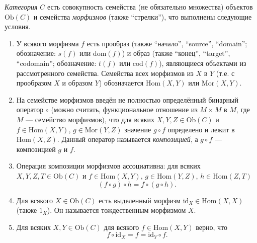 \documentclass[12pt,a4paper]{article}
\newcommand{\Hom}{\mathrm{Hom}}
\newcommand{\Mor}{\mathrm{Mor}}
\newcommand{\dom}{\mathrm{dom}}
\newcommand{\cod}{\mathrm{cod}}
\newcommand{\Ob}{\mathrm{Ob}}
\newcommand{\id}{\mathrm{id}}
\begin{document}
    \begin{definition}
        \emph{Категория} $C$ есть совокупность семейства (не обязательно множества) объектов $\Ob(C)$ и семейства \emph{морфизмов} (также ``стрелки''), что выполнены следующие условия.
        \begin{enumerate}
            \item У всякого морфизма $f$ есть прообраз (также ``начало'', ``source'', ``domain''; обозначение: $s(f)$ или $\dom(f)$) и образ (также ``конец'', ``target'', ``codomain''; обозначение: $t(f)$ или $\cod(f)$), являющиеся объектами из рассмотренного семейства. Семейства всех морфизмов из $X$ в $Y$ (т.е. с прообразом $X$ и образом $Y$) обозначается $\Hom(X, Y)$ или $\Mor(X, Y)$.
            \item На семействе морфизмов введён не полностью определённый бинарный оператор $\circ$ (можно считать, функциональное отношение из $M \times M$ в $M$, где $M$ --- семейство морфизмов), что для всяких $X, Y, Z \in \Ob(C)$ и $f \in \Hom(X, Y)$, $g \in \Mor(Y, Z)$ значение $g \circ f$ определено и лежит в $\Hom(X, Z)$. Данный оператор называется \emph{композицией}, а $g \circ f$ --- композицией $g$ и $f$.
            \item Операция композиции морфизмов ассоциативна: для всяких $X, Y, Z, T \in \Ob(C)$ и $f \in \Hom(X, Y)$, $g \in \Hom(Y, Z)$, $h \in \Hom(Z, T)$
                \[(f \circ g) \circ h = f \circ (g \circ h).\]
            \item Для всякого $X \in \Ob(C)$ есть выделенный морфизм $\id_X \in \Hom(X, X)$ (также $1_X$). Он называется тождественным морфизмом $X$.
            \item Для всяких $X, Y \in \Ob(C)$ для всякого $f \in \Hom(X, Y)$ верно, что
                \[f \circ \id_X = f = \id_Y \circ f.\]
        \end{enumerate}
    \end{definition}
\end{document}

